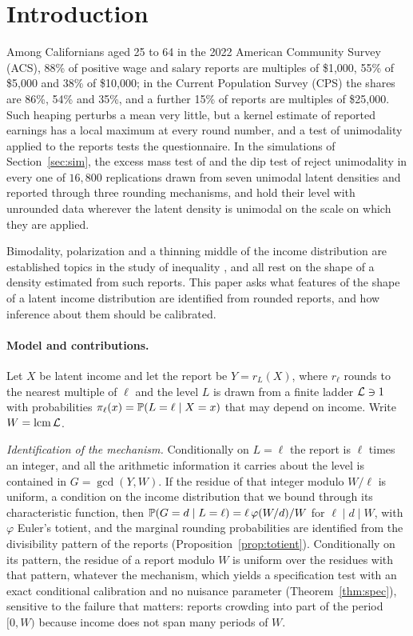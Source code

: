 \section{Introduction}\label{sec:intro}

Among Californians aged 25 to 64 in the 2022 American Community Survey (ACS), 88\% of positive wage and salary reports are multiples of \$1{,}000, 55\% of \$5{,}000 and 38\% of \$10{,}000; in the Current Population Survey (CPS) the shares are 86\%, 54\% and 35\%, and a further 15\% of reports are multiples of \$25{,}000. Such heaping perturbs a mean very little, but a kernel estimate of reported earnings has a local maximum at every round number, and a test of unimodality applied to the reports tests the questionnaire. In the simulations of Section~\ref{sec:sim}, the excess mass test of \citet{AmeijeirasAlonsoCRC2019} and the dip test of \citet{ChengHall1998} reject unimodality in every one of $16{,}800$ replications drawn from seven unimodal latent densities and reported through three rounding mechanisms, and hold their level with unrounded data wherever the latent density is unimodal on the scale on which they are applied.

Bimodality, polarization and a thinning middle of the income distribution are established topics in the study of inequality \citep{EstebanRay1994,Wolfson1994,Jenkins1995,Quah1996,CowellJenkinsLitchfield1996,DuclosEstebanRay2004,PittauZelliJohnson2010}, and all rest on the shape of a density estimated from such reports. This paper asks what features of the shape of a latent income distribution are identified from rounded reports, and how inference about them should be calibrated.

\paragraph{Model and contributions.}
Let $X$ be latent income and let the report be $Y=r_L(X)$, where $r_\ell$ rounds to the nearest multiple of $\ell$ and the level $L$ is drawn from a finite ladder $\mathcal{L}\ni 1$ with probabilities $\pi_\ell(x)=\mathbb{P}(L=\ell\mid X=x)$ that may depend on income. Write $W=\operatorname{lcm}\mathcal{L}$.

\emph{Identification of the mechanism.} Conditionally on $L=\ell$ the report is $\ell$ times an integer, and all the arithmetic information it carries about the level is contained in $G=\gcd(Y,W)$. If the residue of that integer modulo $W/\ell$ is uniform, a condition on the income distribution that we bound through its characteristic function, then $\mathbb{P}(G=d\mid L=\ell)=\ell\,\varphi(W/d)/W$ for $\ell\mid d\mid W$, with $\varphi$ Euler's totient, and the marginal rounding probabilities are identified from the divisibility pattern of the reports (Proposition~\ref{prop:totient}). Conditionally on its pattern, the residue of a report modulo $W$ is uniform over the residues with that pattern, whatever the mechanism, which yields a specification test with an exact conditional calibration and no nuisance parameter (Theorem~\ref{thm:spec}), sensitive to the failure that matters: reports crowding into part of the period $[0,W)$ because income does not span many periods of $W$.

